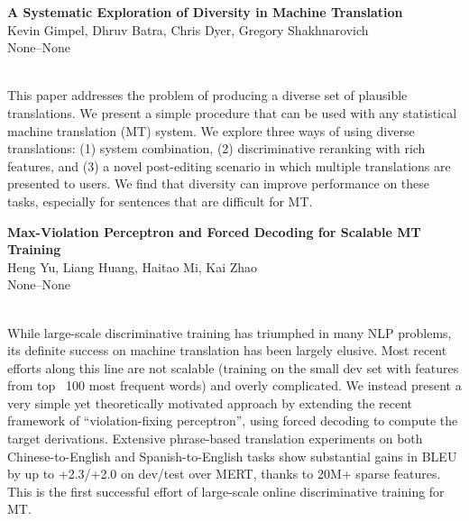 \documentclass[twoside,makeidx]{book}
\renewcommand{\normalsize}{\fontsize{8}{9}\selectfont}
\renewcommand{\small}{\fontsize{7}{8}\selectfont}
\begin{document}
\par\vspace{2em}\noindent%
\begin{minipage}{\linewidth}%
\begin{center}
\textbf{\normalsize A Systematic Exploration of Diversity in Machine Translation}\\
\normalsize  Kevin Gimpel,  Dhruv Batra,  Chris Dyer,  Gregory Shakhnarovich\\
{\small None--None}\\
\end{center}
\end{minipage}\\[0.5em]
\nopagebreak%
\noindent%
{\small This paper addresses the problem of producing a diverse set of plausible translations. We present a simple procedure that can be used with any statistical machine translation (MT) system. We explore three ways of using diverse translations: (1) system combination, (2) discriminative reranking with rich features, and (3) a novel post-editing scenario in which multiple translations are presented to users. We find that diversity can improve performance on these tasks, especially for sentences that are difficult for MT.}
\par\vspace{2em}\noindent%
\begin{minipage}{\linewidth}%
\begin{center}
\textbf{\normalsize Max-Violation Perceptron and Forced Decoding for Scalable MT Training}\\
\normalsize  Heng Yu,  Liang Huang,  Haitao Mi,  Kai Zhao\\
{\small None--None}\\
\end{center}
\end{minipage}\\[0.5em]
\nopagebreak%
\noindent%
{\small While large-scale discriminative training has triumphed in many NLP problems, its definite success on machine translation has been largely elusive. Most recent efforts along this line are not scalable (training on the small dev set with features from top ~100 most frequent words) and overly complicated. We instead present a very simple yet theoretically motivated approach by extending the recent framework of ``violation-fixing perceptron'', using forced decoding to compute the target derivations. Extensive phrase-based translation experiments on both Chinese-to-English and Spanish-to-English tasks show substantial gains in BLEU by up to +2.3/+2.0 on dev/test over MERT, thanks to 20M+ sparse features. This is the first successful effort of large-scale online discriminative training for MT.}
\end{document}
